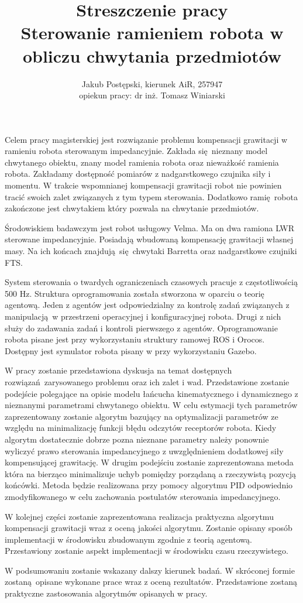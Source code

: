 \documentclass[12pt,a4paper]{article}
\begin{document}
	\title{Streszczenie pracy \\ Sterowanie ramieniem robota w obliczu chwytania przedmiotów}
	\author{Jakub Postępski, kierunek AiR, 257947 \\ opiekun pracy: dr inż. Tomasz Winiarski}
	\maketitle



	Celem pracy magisterskiej jest rozwiązanie problemu kompensacji grawitacji w ramieniu robota sterowanym impedancyjnie. Zakłada się nieznany model chwytanego obiektu, znany model ramienia robota oraz nieważkość ramienia robota. Zakładamy dostępność pomiarów z nadgarstkowego czujnika siły i momentu. W trakcie wspomnianej kompensacji grawitacji robot nie powinien tracić swoich zalet związanych z tym typem sterowania. Dodatkowo ramię robota zakończone jest chwytakiem który pozwala na chwytanie przedmiotów.

	Środowiskiem badawczym jest robot usługowy Velma. Ma on dwa ramiona LWR sterowane impedancyjnie. Posiadają wbudowaną kompensację grawitacji własnej masy. Na ich końcach znajdują się chwytaki Barretta oraz nadgarstkowe czujniki FTS.

	System sterowania o twardych ograniczeniach czasowych pracuje z częstotliwością 500 Hz. Struktura oprogramowania została stworzona w oparciu o teorię agentową. Jeden z agentów jest odpowiedzialny za kontrolę zadań związanych z manipulacją w przestrzeni operacyjnej i konfiguracyjnej robota. Drugi z nich służy do zadawania zadań i kontroli pierwszego z agentów. Oprogramowanie robota pisane jest przy wykorzystaniu struktury ramowej ROS i Orocos. Dostępny jest symulator robota pisany w przy wykorzystaniu Gazebo.

	W pracy zostanie przedstawiona dyskusja na temat dostępnych rozwiązań zarysowanego problemu oraz ich zalet i wad. Przedstawione zostanie podejście polegające na opisie modelu łańcucha kinematycznego i dynamicznego z nieznanymi parametrami chwytanego obiektu. W celu estymacji tych parametrów zaprezentowany zostanie algorytm bazujący na optymalizacji parametrów ze względu na minimalizację funkcji błędu odczytów receptorów robota. Kiedy algorytm dostatecznie dobrze pozna nieznane parametry należy ponownie wyliczyć prawo sterowania impedancyjnego z uwzględnieniem dodatkowej siły kompensującej grawitację. W drugim podejściu zostanie zaprezentowana metoda która na bierząco minimalizuje uchyb pomiędzy porządaną a rzeczywistą pozycją końcówki. Metoda będzie realizowana przy pomocy algorytmu PID odpowiednio zmodyfikowanego w celu zachowania postulatów sterowania impedancyjnego.

	W kolejnej części zostanie zaprezentowana realizacja praktyczna algorytmu kompensacji grawitacji wraz z oceną jakości algorytmu. Zostanie opisany sposób implementacji w środowisku zbudowanym zgodnie z teorią agentową. Przestawiony zostanie aspekt implementacji w środowisku czasu rzeczywistego.

	W podsumowaniu zostanie wskazany dalszy kierunek badań. W skróconej formie zostaną opisane wykonane prace wraz z oceną rezultatów. Przedstawione zostaną praktyczne zastosowania algorytmów opisanych w pracy.
\end{document}
